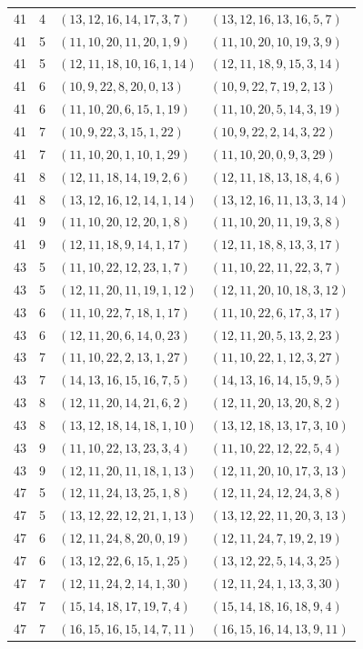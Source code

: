 \begin{longtable}{rrll}
41&4&$(13,12,16,14,17,3,7)$&$(13,12,16,13,16,5,7)$\\
41&5&$(11,10,20,11,20,1,9)$&$(11,10,20,10,19,3,9)$\\
41&5&$(12,11,18,10,16,1,14)$&$(12,11,18,9,15,3,14)$\\
41&6&$(10,9,22,8,20,0,13)$&$(10,9,22,7,19,2,13)$\\
41&6&$(11,10,20,6,15,1,19)$&$(11,10,20,5,14,3,19)$\\
41&7&$(10,9,22,3,15,1,22)$&$(10,9,22,2,14,3,22)$\\
41&7&$(11,10,20,1,10,1,29)$&$(11,10,20,0,9,3,29)$\\
41&8&$(12,11,18,14,19,2,6)$&$(12,11,18,13,18,4,6)$\\
41&8&$(13,12,16,12,14,1,14)$&$(13,12,16,11,13,3,14)$\\
41&9&$(11,10,20,12,20,1,8)$&$(11,10,20,11,19,3,8)$\\
41&9&$(12,11,18,9,14,1,17)$&$(12,11,18,8,13,3,17)$\\
43&5&$(11,10,22,12,23,1,7)$&$(11,10,22,11,22,3,7)$\\
43&5&$(12,11,20,11,19,1,12)$&$(12,11,20,10,18,3,12)$\\
43&6&$(11,10,22,7,18,1,17)$&$(11,10,22,6,17,3,17)$\\
43&6&$(12,11,20,6,14,0,23)$&$(12,11,20,5,13,2,23)$\\
43&7&$(11,10,22,2,13,1,27)$&$(11,10,22,1,12,3,27)$\\
43&7&$(14,13,16,15,16,7,5)$&$(14,13,16,14,15,9,5)$\\
43&8&$(12,11,20,14,21,6,2)$&$(12,11,20,13,20,8,2)$\\
43&8&$(13,12,18,14,18,1,10)$&$(13,12,18,13,17,3,10)$\\
43&9&$(11,10,22,13,23,3,4)$&$(11,10,22,12,22,5,4)$\\
43&9&$(12,11,20,11,18,1,13)$&$(12,11,20,10,17,3,13)$\\
47&5&$(12,11,24,13,25,1,8)$&$(12,11,24,12,24,3,8)$\\
47&5&$(13,12,22,12,21,1,13)$&$(13,12,22,11,20,3,13)$\\
47&6&$(12,11,24,8,20,0,19)$&$(12,11,24,7,19,2,19)$\\
47&6&$(13,12,22,6,15,1,25)$&$(13,12,22,5,14,3,25)$\\
47&7&$(12,11,24,2,14,1,30)$&$(12,11,24,1,13,3,30)$\\
47&7&$(15,14,18,17,19,7,4)$&$(15,14,18,16,18,9,4)$\\
47&7&$(16,15,16,15,14,7,11)$&$(16,15,16,14,13,9,11)$\\

\end{longtable}
